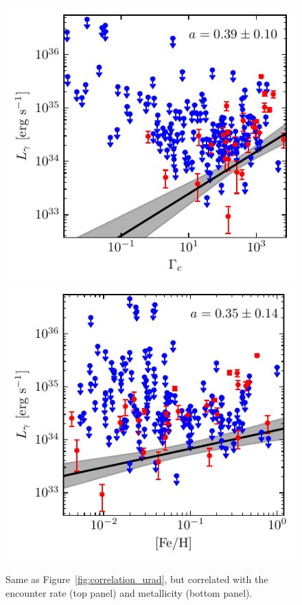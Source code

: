 \documentclass[doublespace,draft,nopageskip]{VTthesis} %
\begin{document}
\begin{figure}
    \centering
    \includegraphics[width=\columnwidth]{Figures/Globular/correlation/L_gamma_vs_encounter_rate.pdf}
    \includegraphics[width=\columnwidth]{Figures/Globular/correlation/L_gamma_vs_metallicity.pdf}
    \caption{\label{fig:correlation_other} Same as Figure~\ref{fig:correlation_urad}, but correlated with the encounter rate (top panel) and metallicity (bottom panel).}
\end{figure}
\end{document}
